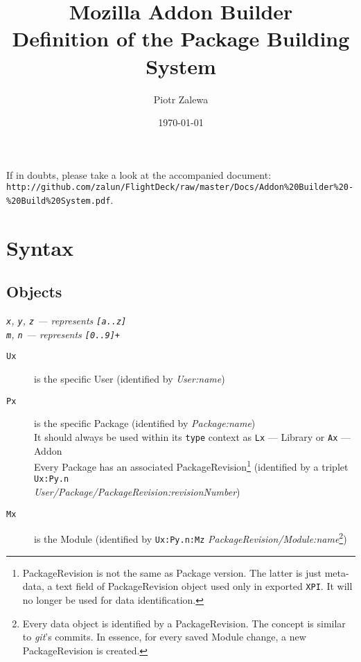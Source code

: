 \documentclass[10pt]{article}
\title{Mozilla Addon Builder\\ Definition of the Package Building System}
\author{Piotr Zalewa}
\date{\today}
\def\xpi{{\tt XPI}}
\begin{document}
\maketitle


\noindent If in doubts, please take a look at the accompanied document:\\ {\tt http://github.com/zalun/FlightDeck/raw/master/Docs/Addon\%20Builder\%20-\%20Build\%20System.pdf}.

\section{Syntax}

	\subsection{Objects}
	
	{\em \small {\tt x}, {\tt y}, {\tt z} --- represents {\tt [a..z]}\\
	{\tt m}, {\tt n} --- represents {\tt [0..9]+}}
	
	\begin{description}
		\item[{\tt Ux}] is the specific User (identified by {\em User:name})
		\item[{\tt Px}] is the specific Package (identified by {\em Package:name})\\
			It should always be used within its {\tt type} context as {\tt Lx} --- Library or {\tt Ax} --- 
			Addon\\
			Every Package has an associated PackageRevision\footnote{PackageRevision is not the same as 
			Package version. The latter is just meta-data, a text field of PackageRevision object used only 
			in exported \xpi. It will no longer be used for data identification.} (identified by a triplet 
			{\tt Ux:Py.n} \\{\em User/Package/PackageRevision:revisionNumber})
		\item[{\tt Mx}] is the Module (identified by {\tt Ux:Py.n:Mz} 
		{\em PackageRevision/Module:name}\footnote{Every data object is identified by a PackageRevision. 
		The concept is similar to {\em git}'s commits. In essence, for every saved Module change, a new 
		PackageRevision is created.})
	\end{description}
\end{document}
